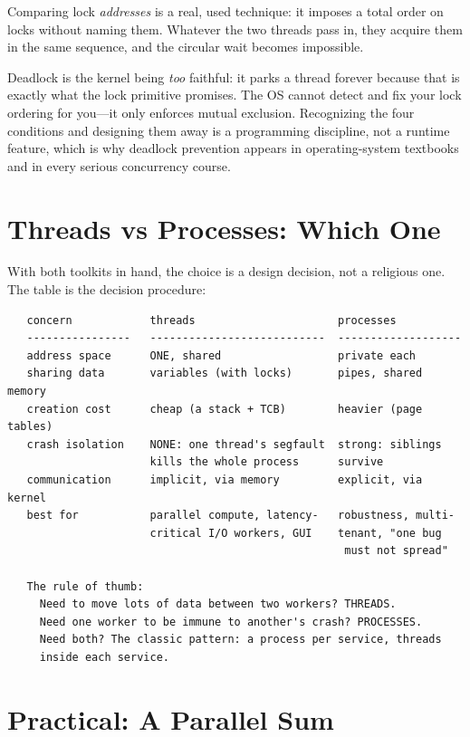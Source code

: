 Comparing lock \emph{addresses} is a real, used technique: it imposes
a total order on locks without naming them. Whatever the two threads
pass in, they acquire them in the same sequence, and the circular wait
becomes impossible.

\begin{osconcept}
Deadlock is the kernel being \emph{too} faithful: it parks a thread
forever because that is exactly what the lock primitive promises. The
OS cannot detect and fix your lock ordering for you---it only enforces
mutual exclusion. Recognizing the four conditions and designing them
away is a programming discipline, not a runtime feature, which is why
deadlock prevention appears in operating-system textbooks and in
every serious concurrency course.
\end{osconcept}

\section{Threads vs Processes: Which One}

With both toolkits in hand, the choice is a design decision, not a
religious one. The table is the decision procedure:

\begin{verbatim}
   concern            threads                      processes
   ----------------   ---------------------------  -------------------
   address space      ONE, shared                  private each
   sharing data       variables (with locks)       pipes, shared memory
   creation cost      cheap (a stack + TCB)        heavier (page tables)
   crash isolation    NONE: one thread's segfault  strong: siblings
                      kills the whole process      survive
   communication      implicit, via memory         explicit, via kernel
   best for           parallel compute, latency-   robustness, multi-
                      critical I/O workers, GUI    tenant, "one bug
                                                    must not spread"

   The rule of thumb:
     Need to move lots of data between two workers? THREADS.
     Need one worker to be immune to another's crash? PROCESSES.
     Need both? The classic pattern: a process per service, threads
     inside each service.
\end{verbatim}

\section{Practical: A Parallel Sum}

